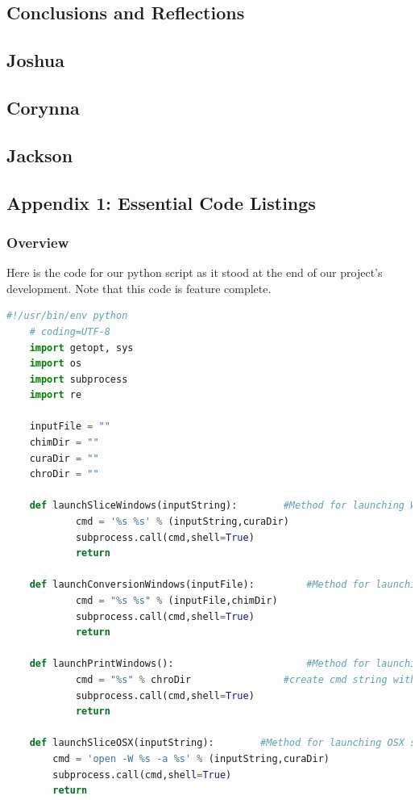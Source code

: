 \documentclass[letterpaper, onecolumn, draftclsnofoot, 10pt, compsoc]{IEEEtran}
\begin{document}
\begin{singlespace}
	\section{Conclusions and Reflections}
	\subsection{Joshua}
	
	\subsection{Corynna}
	
	\subsection{Jackson}
	
	
	\subsection{Appendix 1: Essential Code Listings}
	\subsubsection{Overview}
	Here is the code for our python script as it stood at the end of our project's development. Note that this code is feature complete.
	
	\begin{lstlisting}[language=Python]
	#!/usr/bin/env python
	# coding=UTF-8
	import getopt, sys
	import os
	import subprocess
	import re
	
	inputFile = ""
	chimDir = ""
	curaDir = ""
	chroDir = ""
	
	def launchSliceWindows(inputString):       	#Method for launching Windows slicing software
			cmd = '%s %s' % (inputString,curaDir)
			subprocess.call(cmd,shell=True)
			return
	
	def launchConversionWindows(inputFile):       	#Method for launching Windows conversion software
			cmd = "%s %s" % (inputFile,chimDir)
			subprocess.call(cmd,shell=True)
			return
	
	def launchPrintWindows():                   	#Method for launching Windows printing software
			cmd = "%s" % chroDir         		#create cmd string with wait flag to hold execution
			subprocess.call(cmd,shell=True)
			return
	
	def launchSliceOSX(inputString):		#Method for launching OSX slicing software
		cmd = 'open -W %s -a %s' % (inputString,curaDir)
		subprocess.call(cmd,shell=True)
		return
	

\end{lstlisting}
\end{singlespace}
\end{document}
